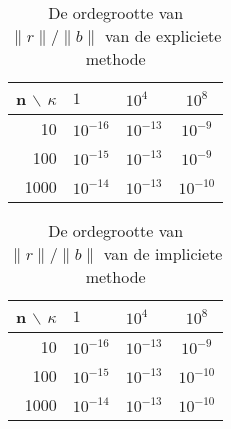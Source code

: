 \begin{table}[H]
\begin{center}
\begin{tabular}{r|llc}
n $\backslash$ $\kappa$ & $1$ & $10^4$ & $10^8$ \\\hline
10 & $10^{-16}$ & $10^{-13}$ & $10^{-9}$ \\
100 & $10^{-15}$ & $10^{-13}$ & $10^{-9}$ \\
1000 & $10^{-14}$ & $10^{-13}$ & $10^{-10}$
\end{tabular}
\end{center}
\caption{De ordegrootte van $\lVert r \rVert/\lVert b \rVert$ van de expliciete methode}
\label{rb_exp}
\end{table}

\begin{table}[H]
\begin{center}
\begin{tabular}{r|llc}
n $\backslash$ $\kappa$ & $1$ & $10^4$ & $10^8$ \\\hline
10 & $10^{-16}$ & $10^{-13}$ & $10^{-9}$ \\
100 & $10^{-15}$ & $10^{-13}$ & $10^{-10}$ \\
1000 & $10^{-14}$ & $10^{-13}$ & $10^{-10}$
\end{tabular}
\end{center}
\caption{De ordegrootte van $\lVert r \rVert/\lVert b \rVert$ van de impliciete methode}
\label{rb_imp}
\end{table}